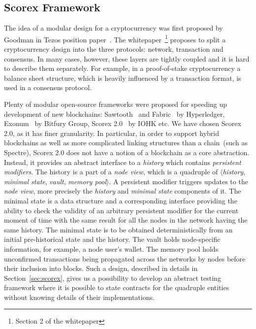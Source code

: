 
\subsection{Scorex Framework}

The idea of a modular design for a cryptocurrency was first proposed by Goodman in Tezos position paper~\cite{tezosPosition}. The whitepaper~\footnote{Section 2 of the whitepaper} proposes to split a cryptocurrency design into the three protocols: network, transaction and consensus. In many cases, however, these layers are tightly coupled and it is hard to describe them separately. For example, in a proof-of-stake cryptocurrency a balance sheet structure, which is heavily influenced by a transaction format, is used in a consensus protocol. 

Plenty of modular open-source frameworks were proposed for speeding up development of new blockchains: Sawtooth~\cite{sawtooth} and Fabric~\cite{fabric} by Hyperledger, Exonum~\cite{exonum} by Bitfury Group, Scorex 2.0~\cite{scorex} by IOHK etc. We have chosen Scorex 2.0, as it has finer granularity. In particular, in order to support hybrid blockchains as well as more complicated linking structures than a chain~(such as Spectre\cite{spectre}), Scorex 2.0 does not have a notion of a blockchain as a core abstraction. Instead, it provides an abstract interface to a \textit{history} which contains \textit{persistent modifiers}. The history is a part of a \textit{node view}, which is a quadruple of $\langle$\textit{history}, \textit{minimal state}, \textit{vault}, \textit{memory pool}$\rangle$. A persistent modifier triggers updates to the \textit{node view}, more precisely the \textit{history} and \textit{minimal state} components of it. The minimal state is a data structure and a corresponding interface providing the ability to check the validity of an arbitrary persistent modifier for the current moment of time with the same result for all the nodes in the network having the same history. The minimal state is to be obtained deterministically from an initial pre-historical state and the history. The vault holds node-specific information, for example, a node user's wallet. The memory pool holds unconfirmed transactions being propagated across the networks by nodes before their inclusion into blocks. Such a design, described in details in Section~\ref{sec:scorex}, gives us a possibility to develop an abstract testing framework where it is possible to state contracts for the quadruple entities without knowing details of their implementations.